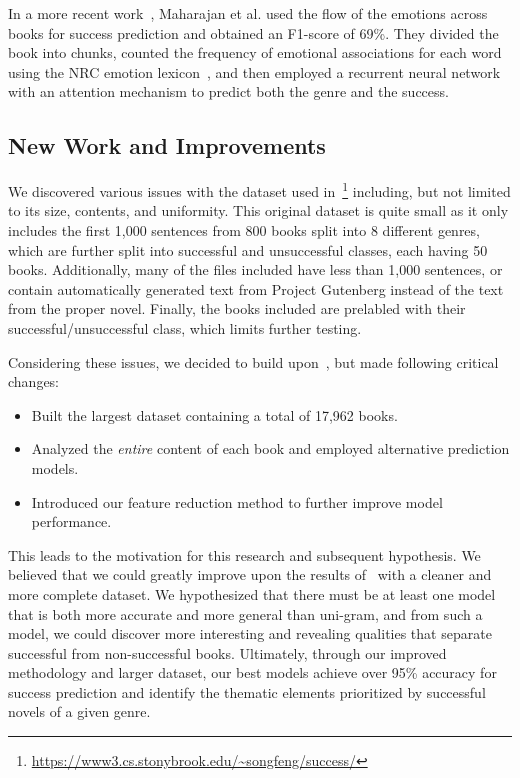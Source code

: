 In a more recent work~\cite{maharjan_emotion}, Maharajan et al. used the flow of the emotions across books for success prediction and obtained an F1-score of 69\%.
They divided the book into chunks, counted the frequency of emotional associations for each word using the NRC emotion lexicon~\cite{NRC}, and then employed a recurrent neural network with an attention mechanism to predict both the genre and the success.

\subsection*{New Work and Improvements}
We discovered various issues with the dataset used in~\cite{ashok2013}\footnote{\url{https://www3.cs.stonybrook.edu/~songfeng/success/}} including, but not limited to its size, contents, and uniformity.
This original dataset is quite small as it only includes the first 1,000 sentences from 800 books split into 8 different genres, which are further split into successful and unsuccessful classes, each having 50 books.
Additionally, many of the files included have less than 1,000 sentences, or contain automatically generated text from Project Gutenberg instead of the text from the proper novel.
Finally, the books included are prelabled with their successful/unsuccessful class, which limits further testing.

Considering these issues, we decided to build upon~\cite{ashok2013}, but made following critical changes:
\begin{itemize}
    \item Built the largest dataset containing a total of 17,962 books.
    \item Analyzed the \textit{entire} content of each book and employed alternative prediction models.
    \item Introduced our feature reduction method to further improve model performance.
\end{itemize}
This leads to the motivation for this research and subsequent hypothesis.
We believed that we could greatly improve upon the results of~\cite{ashok2013} with a cleaner and more complete dataset.
We hypothesized that there must be at least one model that is both more accurate and more general than uni-gram, and from such a model, we could discover more interesting and revealing qualities that separate successful from non-successful books.
Ultimately, through our improved methodology and larger dataset, our best models achieve over 95\% accuracy for success prediction and identify the thematic elements prioritized by successful novels of a given genre.